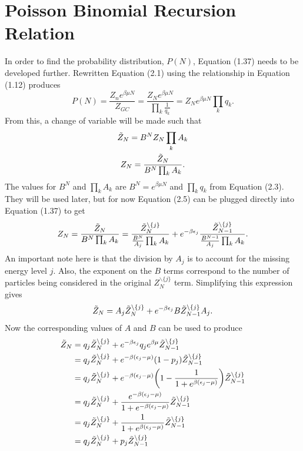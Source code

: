 \section{Poisson Binomial Recursion Relation}
In order to find the probability distribution, $P(N)$, Equation (1.37) needs to be developed further. Rewritten Equation (2.1) using the relationship in Equation (1.12) produces
\begin{equation}
    P(N)=\frac{Z_n e^{\beta\mu N}}{Z_{GC}}=\frac{Z_N e^{\beta\mu N}}{\prod_k \frac{1}{q_k}}= Z_N e^{\beta\mu N} \prod_k q_k.
\end{equation}
From this, a change of variable will be made such that 
\begin{gather}
    \Tilde{Z}_N = B^N Z_N \prod_k A_k\\
    Z_N=\frac{\Tilde{Z}_N}{B^N \prod_k A_k}.
\end{gather}
The values for $B^N$ and $\prod_k A_k$ are $B^N=e^{\beta\mu N}$ and $\prod_k q_k$ from Equation (2.3). They will be used later, but for now Equation (2.5) can be plugged directly into Equation (1.37) to get
\begin{equation}
    Z_N=\frac{\Tilde{Z}_N}{B^N \prod_k A_k} = \frac{\Tilde{Z}_N^{\backslash\{j\}}}{\frac{B^N}{A_j} \prod_k A_k}+e^{-\beta\epsilon_j}\frac{\Tilde{Z}_{N-1}^{\backslash\{j\}}}{\frac{B^{N-1}}{A_j} \prod_k A_k}.
\end{equation}
An important note here is that the division by $A_j$ is to account for the missing energy level $j$. Also, the exponent on the $B$ terms correspond to the number of particles being considered in the original $Z_N^{\backslash\{j\}}$ term. Simplifying this expression gives
\begin{equation}
   \Tilde{Z}_N=A_j \Tilde{Z}_N^{\backslash\{j\}}+ e^{-\beta\epsilon_j} B \Tilde{Z}_{N-1}^{\backslash\{j\}} A_j.
\end{equation}
Now the corresponding values of $A$ and $B$ can be used to produce
\begin{align}
    \Tilde{Z}_N&=q_j \Tilde{Z}_N^{\backslash\{j\}}+ e^{-\beta\epsilon_j} q_j e^{\beta\mu} \Tilde{Z}_{N-1}^{\backslash\{j\}}\nonumber\\
    &=q_j \Tilde{Z}_N^{\backslash\{j\}}+ e^{-\beta(\epsilon_j-\mu)} (1-p_j) \Tilde{Z}_{N-1}^{\backslash\{j\}}\nonumber\\
    &=q_j \Tilde{Z}_N^{\backslash\{j\}}+ e^{-\beta(\epsilon_j-\mu)} \qty(1-\frac{1}{1+e^{\beta(\epsilon_j-\mu)}}) \Tilde{Z}_{N-1}^{\backslash\{j\}}\nonumber\\
    &=q_j \Tilde{Z}_N^{\backslash\{j\}}+ \frac{e^{-\beta(\epsilon_j-\mu)}}{1+e^{-\beta(\epsilon_j-\mu)}} \Tilde{Z}_{N-1}^{\backslash\{j\}}\nonumber\\
    &=q_j \Tilde{Z}_N^{\backslash\{j\}}+ \frac{1}{1+e^{\beta(\epsilon_j-\mu)}} \Tilde{Z}_{N-1}^{\backslash\{j\}}\nonumber\\
    &=q_j \Tilde{Z}_N^{\backslash\{j\}}+ p_j \Tilde{Z}_{N-1}^{\backslash\{j\}}
\end{align}
